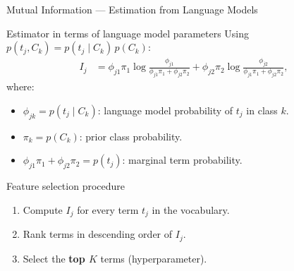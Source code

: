 \begin{frame}{Mutual Information — Estimation from Language Models}
  \begin{block}{Estimator in terms of language model parameters}
    Using $p(t_j,C_k)=p(t_j\mid C_k)\,p(C_k)$:
    \begin{align*}
      I_j &= \phi_{j1}\pi_1\log\frac{\phi_{j1}}{\phi_{j1}\pi_1+\phi_{j2}\pi_2}
           +\phi_{j2}\pi_2\log\frac{\phi_{j2}}{\phi_{j1}\pi_1+\phi_{j2}\pi_2},
    \end{align*}
    where:
    \begin{itemize}
      \item $\phi_{jk}=p(t_j\mid C_k)$: language model probability of $t_j$ in class $k$.
      \item $\pi_k=p(C_k)$: prior class probability.
      \item $\phi_{j1}\pi_1+\phi_{j2}\pi_2=p(t_j)$: marginal term probability.
    \end{itemize}
  \end{block}

  \begin{block}{Feature selection procedure}
    \begin{enumerate}
      \item Compute $I_j$ for every term $t_j$ in the vocabulary.
      \item Rank terms in descending order of $I_j$.
      \item Select the \textbf{top $K$} terms (hyperparameter).
    \end{enumerate}
  \end{block}
\end{frame}

